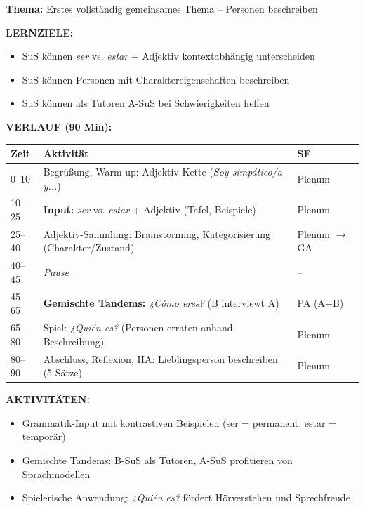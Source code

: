\documentclass[11pt, a4paper]{article}
\newcommand{\es}[1]{\textcolor{spanisch}{\textit{#1}}}
\begin{document}
\begin{dsbox}[title={DS 6 -- Brückenthema: Personas y características (Di, 20.01.2026)}]

\textbf{Thema:} Erstes vollständig gemeinsames Thema -- Personen beschreiben

\vspace{0.3cm}

\textbf{LERNZIELE:}
\begin{itemize}[leftmargin=1.5em, nosep]
    \item[Alle:] SuS können \es{ser} vs. \es{estar} + Adjektiv kontextabhängig unterscheiden
    \item[Alle:] SuS können Personen mit Charaktereigenschaften beschreiben
    \item[\textcolor{gruppeB}{B:}] SuS können als Tutoren A-SuS bei Schwierigkeiten helfen
\end{itemize}

\vspace{0.2cm}

\textbf{VERLAUF (90 Min):}

\begin{tabular}{|p{1.2cm}|p{9cm}|p{3.5cm}|}
\hline
\rowcolor{hellgrau}
\textbf{Zeit} & \textbf{Aktivität} & \textbf{SF} \\
\hline
0--10 & Begrüßung, Warm-up: Adjektiv-Kette (\es{Soy simpático/a y...}) & Plenum \\
\hline
10--25 & \textbf{Input:} \es{ser} vs. \es{estar} + Adjektiv (Tafel, Beispiele) & Plenum \\
\hline
25--40 & Adjektiv-Sammlung: Brainstorming, Kategorisierung (Charakter/Zustand) & Plenum $\rightarrow$ GA \\
\hline
40--45 & \textit{Pause} & -- \\
\hline
45--65 & \textbf{Gemischte Tandems:} \es{¿Cómo eres?} (B interviewt A) & PA (A+B) \\
\hline
65--80 & Spiel: \es{¿Quién es?} (Personen erraten anhand Beschreibung) & Plenum \\
\hline
80--90 & Abschluss, Reflexion, HA: Lieblingsperson beschreiben (5 Sätze) & Plenum \\
\hline
\end{tabular}

\vspace{0.2cm}

\textbf{AKTIVITÄTEN:}
\begin{itemize}[leftmargin=1.5em, nosep]
    \item Grammatik-Input mit kontrastiven Beispielen (ser = permanent, estar = temporär)
    \item Gemischte Tandems: B-SuS als Tutoren, A-SuS profitieren von Sprachmodellen
    \item Spielerische Anwendung: \es{¿Quién es?} fördert Hörverstehen und Sprechfreude
\end{itemize}


\end{dsbox}
\end{document}
